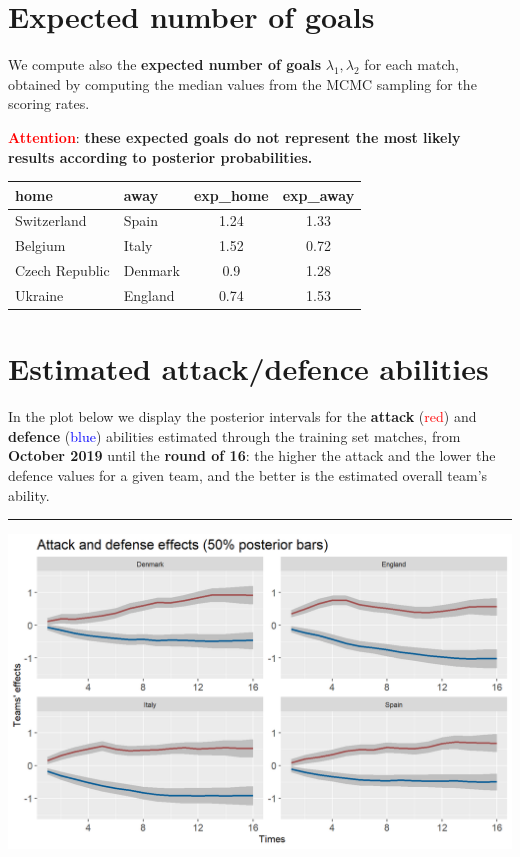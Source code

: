 \documentclass[10pt,]{article}
\begin{document}
\section{Expected number of goals}\label{expected-number-of-goals}

We compute also the \textbf{expected number of goals}
\(\lambda_1, \lambda_2\) for each match, obtained by computing the
median values from the MCMC sampling for the scoring rates.

\textcolor{red}{\textbf{Attention}}: \textbf{these expected goals do not represent the most likely results according to posterior probabilities.}

\begin{longtable}[]{@{}llcc@{}}
\toprule
home & away & exp\_home & exp\_away\tabularnewline
\midrule
\endhead
Switzerland & Spain & 1.24 & 1.33\tabularnewline
Belgium & Italy & 1.52 & 0.72\tabularnewline
Czech Republic & Denmark & 0.9 & 1.28\tabularnewline
Ukraine & England & 0.74 & 1.53\tabularnewline
\bottomrule
\end{longtable}

\section{Estimated attack/defence
abilities}\label{estimated-attackdefence-abilities}

In the plot below we display the posterior intervals for the
\textbf{attack} (\textcolor{red}{red}) and \textbf{defence} (\textcolor{blue}{blue}) abilities estimated
through the training set matches, from \textbf{October 2019} until the
\textbf{round of 16}: the higher the attack and the lower the defence
values for a given team, and the better is the estimated overall team's
ability.

\begin{center}\rule{0.5\linewidth}{0.5pt}\end{center}

\begin{center}\includegraphics[width=0.8\linewidth]{figs/data-1} \end{center}
\end{document}

